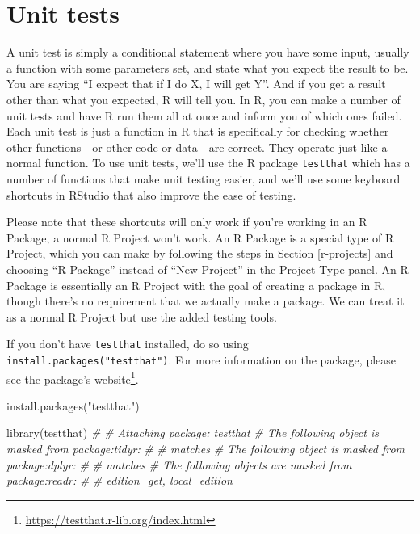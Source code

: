 \documentclass[
]{krantz}
\makeatletter
\newenvironment{Shaded}{\begin{snugshade}}{\end{snugshade}}
\newcommand{\CommentTok}[1]{\textcolor[rgb]{0.37,0.37,0.37}{\textit{#1}}}
\newcommand{\FunctionTok}[1]{\textcolor[rgb]{0,0,0}{#1}}
\newcommand{\NormalTok}[1]{#1}
\newcommand{\StringTok}[1]{\textcolor[rgb]{0.5,0.5,0.5}{#1}}
\renewcommand{\href}[2]{#2\footnote{\url{#1}}}
\newenvironment{kframe}{%
\medskip{}
\setlength{\fboxsep}{.8em}
 \def\at@end@of@kframe{}%
 \ifinner\ifhmode%
  \def\at@end@of@kframe{\end{minipage}}%
  \begin{minipage}{\columnwidth}%
 \fi\fi%
 \def\FrameCommand##1{\hskip\@totalleftmargin \hskip-\fboxsep
 \colorbox{shadecolor}{##1}\hskip-\fboxsep
     \hskip-\linewidth \hskip-\@totalleftmargin \hskip\columnwidth}%
 \MakeFramed {\advance\hsize-\width
   \@totalleftmargin\z@ \linewidth\hsize
   \@setminipage}}%
 {\par\unskip\endMakeFramed%
 \at@end@of@kframe}
\renewenvironment{Shaded}{\begin{kframe}}{\end{kframe}}
\makeatother
\begin{document}
\hypertarget{unit-tests}{%
\section{Unit tests}\label{unit-tests}}

A unit test is simply a conditional statement where you have
some input, usually a function with some parameters set, and
state what you expect the result to be. You are saying ``I
expect that if I do X, I will get Y''. And if you get a
result other than what you expected, R will tell you. In R,
you can make a number of unit tests and have R run them all
at once and inform you of which ones failed. Each unit test
is just a function in R that is specifically for checking
whether other functions - or other code or data - are
correct. They operate just like a normal function. To use
unit tests, we'll use the R package \texttt{testthat} which
has a number of functions that make unit testing easier, and
we'll use some keyboard shortcuts in RStudio that also
improve the ease of testing.

Please note that these shortcuts will only work if you're
working in an R Package, a normal R Project won't work. An R
Package is a special type of R Project, which you can make
by following the steps in Section \ref{r-projects} and
choosing ``R Package'' instead of ``New Project'' in the
Project Type panel. An R Package is essentially an R Project
with the goal of creating a package in R, though there's no
requirement that we actually make a package. We can treat it
as a normal R Project but use the added testing tools.

If you don't have \texttt{testthat} installed, do so using
\texttt{install.packages("testthat")}. For more information
on the package, please see the package's
\href{https://testthat.r-lib.org/index.html}{website}.

\begin{Shaded}
\begin{Highlighting}[]
\FunctionTok{install.packages}\NormalTok{(}\StringTok{"testthat"}\NormalTok{)}
\end{Highlighting}
\end{Shaded}

\begin{Shaded}
\begin{Highlighting}[]
\FunctionTok{library}\NormalTok{(testthat)}
\CommentTok{\# }
\CommentTok{\# Attaching package: \textquotesingle{}testthat\textquotesingle{}}
\CommentTok{\# The following object is masked from \textquotesingle{}package:tidyr\textquotesingle{}:}
\CommentTok{\# }
\CommentTok{\#     matches}
\CommentTok{\# The following object is masked from \textquotesingle{}package:dplyr\textquotesingle{}:}
\CommentTok{\# }
\CommentTok{\#     matches}
\CommentTok{\# The following objects are masked from \textquotesingle{}package:readr\textquotesingle{}:}
\CommentTok{\# }
\CommentTok{\#     edition\_get, local\_edition}
\end{Highlighting}
\end{Shaded}
\end{document}
